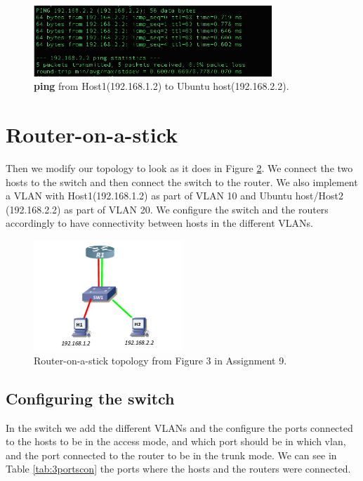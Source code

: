\documentclass{article}
\begin{document}
\begin{figure}[h]
    \centering
    \includegraphics[width=0.8\textwidth]{2ping}
    \caption{\textbf{ping} from Host1(192.168.1.2) to Ubuntu host(192.168.2.2).}
    \label{fig:2ping}
\end{figure}


\section{Router-on-a-stick}

Then we modify our topology to look as it does in Figure \ref{fig:3topo}. We connect the two hosts to the switch and then connect the switch to the router. We also implement a VLAN with Host1(192.168.1.2) as part of VLAN 10 and Ubuntu host/Host2 (192.168.2.2) as part of VLAN 20. We configure the switch and the routers accordingly to have connectivity between hosts in the different VLANs. 

\begin{figure}[h]
    \centering
    \includegraphics[width=0.5\textwidth]{3topo}
    \caption{Router-on-a-stick topology from Figure 3 in Assignment 9.}
    \label{fig:3topo}
\end{figure}

\subsection{Configuring the switch}

In the switch we add the different VLANs and the configure the ports connected to the hosts to be in the access mode, and which port should be in which vlan, and the port connected to the router to be in the trunk mode. We can see in Table \ref{tab:3portscon} the ports where the hosts and the routers were connected. 
\end{document}
